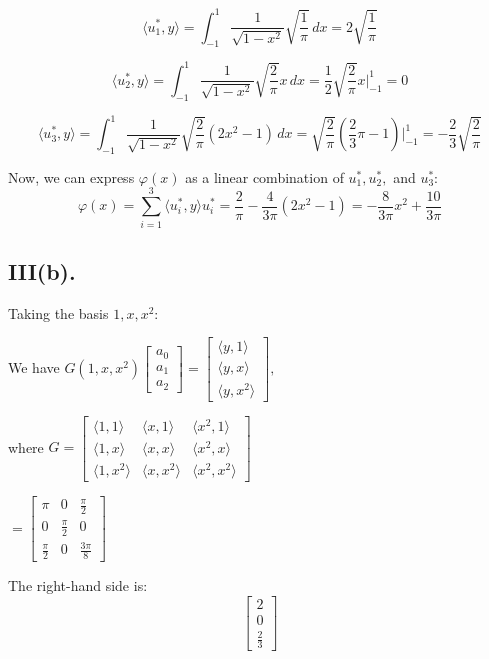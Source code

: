\documentclass[a4paper]{article}
\begin{document}
\[
\langle u_1^*, y \rangle = \int_{-1}^{1} \frac{1}{\sqrt{1-x^2}} \sqrt{\frac{1}{\pi}} \, dx = 2\sqrt{\frac{1}{\pi}}
\]

\[
\langle u_2^*, y \rangle = \int_{-1}^{1} \frac{1}{\sqrt{1-x^2}} \sqrt{\frac{2}{\pi}} x \, dx = \frac{1}{2} \sqrt{\frac{2}{\pi}} x \bigg|_{-1}^{1} = 0
\]

\[
\langle u_3^*, y \rangle = \int_{-1}^{1} \frac{1}{\sqrt{1-x^2}} \sqrt{\frac{2}{\pi}} (2x^2 - 1) \, dx = \sqrt{\frac{2}{\pi}} \left( \frac{2}{3} \pi - 1 \right) \bigg|_{-1}^{1} = -\frac{2}{3} \sqrt{\frac{2}{\pi}}
\]

Now, we can express \( \varphi(x) \) as a linear combination of \( u_1^*, u_2^*, \) and \( u_3^* \):
\[
\varphi(x) = \sum_{i=1}^{3} \langle u_i^*, y \rangle u_i^* = \frac{2}{\pi} - \frac{4}{3\pi} (2x^2 - 1) = -\frac{8}{3\pi} x^2 + \frac{10}{3\pi}
\]

\subsection*{III(b).}
Taking the basis \(1, x, x^2\):

We have \( G(1, x, x^2) \begin{bmatrix} a_0 \\ a_1 \\ a_2 \end{bmatrix} = \begin{bmatrix} \langle y, 1 \rangle \\ \langle y, x \rangle \\ \langle y, x^2 \rangle \end{bmatrix}, \)

where \( G = \begin{bmatrix} \langle 1, 1 \rangle & \langle x, 1 \rangle & \langle x^2, 1 \rangle \\ \langle 1, x \rangle & \langle x, x \rangle & \langle x^2, x \rangle \\ \langle 1, x^2 \rangle & \langle x, x^2 \rangle & \langle x^2, x^2 \rangle \end{bmatrix} \)

\(
= \begin{bmatrix} \pi & 0 & \frac{\pi}{2} \\ 0 & \frac{\pi}{2} & 0 \\ \frac{\pi}{2} & 0 & \frac{3\pi}{8} \end{bmatrix}
\)

The right-hand side is:
\[
\begin{bmatrix} 2 \\ 0 \\ \frac{2}{3} \end{bmatrix}
\]
\end{document}
